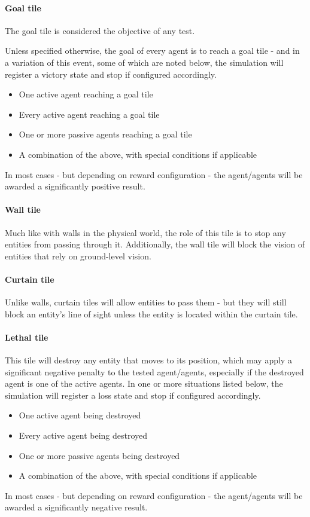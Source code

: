 \documentclass[masterthesis]{fer}
\begin{document}
\paragraph{Goal tile}
The goal tile is considered the objective of any test.

Unless specified otherwise, the goal of every agent is to reach a goal tile - and in a variation of this event, some of which are noted below, the simulation will register a victory state and stop if configured accordingly.
\begin{itemize}
\item One active agent reaching a goal tile
\item Every active agent reaching a goal tile
\item One or more passive agents reaching a goal tile
\item A combination of the above, with special conditions if applicable
\end{itemize}
 In most cases - but depending on reward configuration - the agent/agents will be awarded a significantly positive result.

\paragraph{Wall tile}
Much like with walls in the physical world, the role of this tile is to stop any entities from passing through it. Additionally, the wall tile will block the vision of entities that rely on ground-level vision.

\paragraph{Curtain tile}
Unlike walls, curtain tiles will allow entities to pass them - but they will still block an entity's line of sight unless the entity is located within the curtain tile.

\paragraph{Lethal tile}
This tile will destroy any entity that moves to its position, which may apply a significant negative penalty to the tested agent/agents, especially if the destroyed agent is one of the active agents. In one or more situations listed below, the simulation will register a loss state and stop if configured accordingly.
\begin{itemize}
\item One active agent being destroyed
\item Every active agent being destroyed
\item One or more passive agents being destroyed
\item A combination of the above, with special conditions if applicable
\end{itemize}
 In most cases - but depending on reward configuration - the agent/agents will be awarded a significantly negative result.
\end{document}
